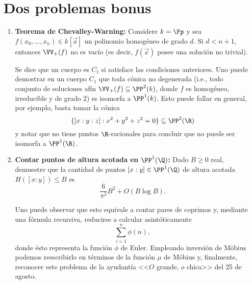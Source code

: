 \documentclass[11pt, reqno]{amsart}
\begin{document}
\section{Dos problemas bonus}
\begin{enumerate}[resume]
	\item \hard
		\textbf{Teorema de Chevalley-Warning:}
		Considere $k = \Fp$ y sea $f(x_0, \dots, x_n) \in k[\vec x]$ un polinomio homogéneo de grado $d$.
		Si $d < n+1$, entonces $\VV_+(f)$ no es vacío (es decir, $f(\vec x)$ posee una solución no trivial).

		Se dice que un cuerpo es $C_1$ si satisface las condiciones anteriores.
		Uno puede demostrar en un cuerpo $C_1$ que toda cónica no degenerada (i.e., todo conjunto de soluciones afín $\VV_+(f) \subseteq \PP^2(k)$,
		donde $f$ es homogéneo, irreducible y de grado 2) es isomorfa a $\PP^1(k)$.
		Esto puede fallar en general, por ejemplo, basta tomar la cónica
		\[
			\{ [x:y:z] : x^2 + y^2 + z^2 = 0 \} \subseteq \PP^2(\R)
		\]
		y notar que no tiene puntos $\R$-racionales para concluir que no puede ser isomorfa a $\PP^1(\R)$.

	\item \hard
		\textbf{Contar puntos de altura acotada en $\PP^1(\Q)$:}
		Dado $B \ge 0$ real, demuestre que la cantidad de puntos $[x : y] \in \PP^1(\Q)$ de altura acotada $H([x : y]) \le B$ es
		$$ \frac{6}{\pi^2}B^2 + O(B \log B). $$
		\begin{hint}
			Uno puede observar que esto equivale a contar pares de coprimos y, mediante una fórmula recursiva, reducirse a calcular
			asintóticamente
			$$ \sum_{i=1}^{n} \phi(n), $$
			donde ésto representa la función $\phi$ de Euler.
			Empleando inversión de Möbius podemos reescribirlo en términos de la función $\mu$ de Möbius y, finalmente, reconocer este problema de
			la ayudantía <<$O$ grande, $o$ chica>> del 25 de agosto.
		\end{hint}
\end{enumerate}
\end{document}
